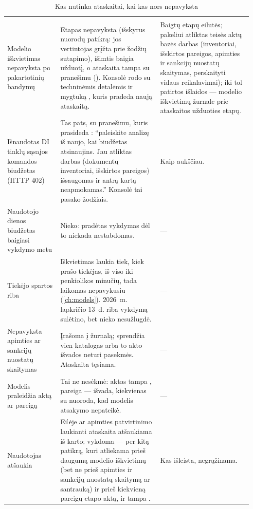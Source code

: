 \begin{xltabular}{\textwidth}{@{}L{34mm}YL{40mm}@{}}
\caption{Kas nutinka ataskaitai, kai kas nors nepavyksta}\label{tab:report:failures}\\
\toprule
{} &  &  \\
\midrule
\endfirsthead
\toprule
{} &  &  \\
\midrule
\endhead
\bottomrule
\endlastfoot
Modelio iškvietimas nepavyksta po pakartotinių bandymų & Etapas nepavyksta (išskyrus nuorodų patikrą: jos vertintojas grįžta prie žodžių sutapimo), išimtis baigia užduotį, o ataskaita tampa  su pranešimu (). Konsolė rodo  su techninėmis detalėmis ir mygtuką , kuris pradeda naują ataskaitą. & Baigtų etapų eilutės; pakeliui atliktas teisės aktų bazės darbas (inventoriai, išskirtos pareigos, apimties ir sankcijų nuostatų skaitymas, perskaityti vidaus reikalavimai); iki tol patirtos išlaidos --- modelio iškvietimų žurnale prie ataskaitos užduoties etapų. \\
Išnaudotas DI tinklų sąsajos komandos biudžetas (HTTP 402) & Tas pats, su pranešimu, kuris prasideda : \enquote{paleiskite analizę iš naujo, kai biudžetas atsinaujins. Jau atliktas darbas (dokumentų inventoriai, išskirtos pareigos) išsaugomas ir antrą kartą neapmokamas.} Konsolė tai pasako žodžiais. & Kaip aukščiau. \\
Naudotojo dienos biudžetas baigiasi vykdymo metu & Nieko: pradėtas vykdymas dėl to niekada nestabdomas. & --- \\
Tiekėjo spartos riba & Iškvietimas laukia tiek, kiek prašo tiekėjas, iš viso iki penkiolikos minučių, tada laikomas nepavykusiu (\cref{ch:models}). 2026~m. lapkričio 13~d. riba vykdymą sulėtino, bet nieko nesužlugdė. & --- \\
Nepavyksta apimties ar sankcijų nuostatų skaitymas & Įrašoma į žurnalą; sprendžia vien katalogas arba to akto išvados neturi pasekmės. Ataskaita tęsiama. & --- \\
Modelis praleidžia aktą ar pareigą & Tai ne nesėkmė: aktas tampa , pareiga ---  išvada, kiekvienas su nuoroda, kad modelis atsakymo nepateikė. & --- \\
Naudotojas atšaukia & Eilėje ar apimties patvirtinimo laukianti ataskaita atšaukiama iš karto; vykdoma --- per kitą patikrą, kuri atliekama prieš daugumą modelio iškvietimų (bet ne prieš apimties ir sankcijų nuostatų skaitymą ar santrauką) ir prieš kiekvieną pareigų etapo aktą, ir tampa . & Kas išleista, negrąžinama. \\

\end{xltabular}
